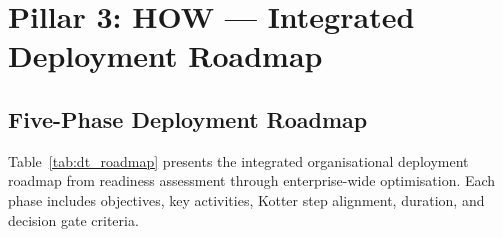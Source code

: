 
\section{Pillar 3: HOW --- Integrated Deployment Roadmap}
\label{sec:dt_deployment_roadmap}

\subsection{Five-Phase Deployment Roadmap}

Table~\ref{tab:dt_roadmap} presents the integrated organisational deployment roadmap from readiness assessment through enterprise-wide optimisation. Each phase includes objectives, key activities, Kotter step alignment, duration, and decision gate criteria.


